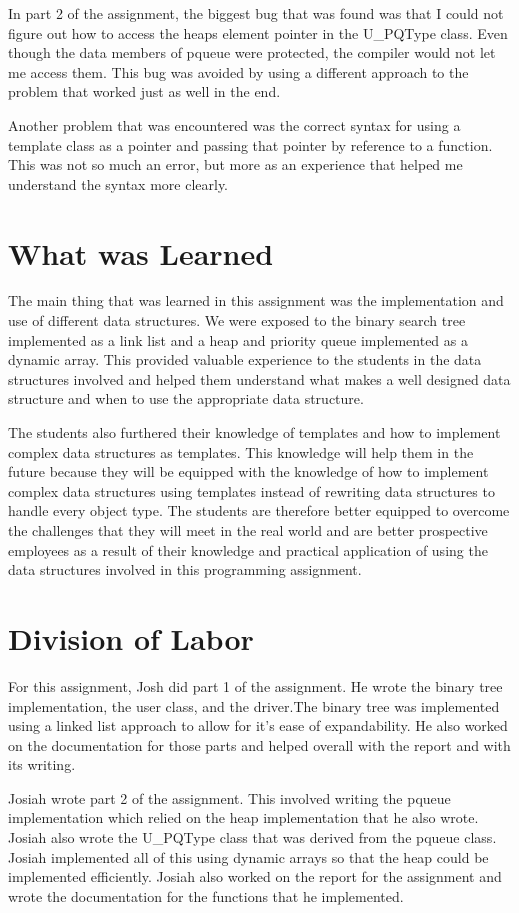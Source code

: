 \documentclass[pdftex, 12pt]{article}
\begin{document}
In part 2 of the assignment, the biggest bug that was found was that I could not figure out how to access the heaps
element pointer in the U\_PQType class. Even though the data members of pqueue were protected, the compiler would not
let me access them. This bug was avoided by using a different approach to the problem that worked just as well in the
end. 

Another problem that was encountered was the correct syntax for using a template class as a pointer and passing that
pointer by reference to a function. This was not so much an error, but more as an experience that helped me understand
the syntax more clearly. 

\section{What was Learned}

The main thing that was learned in this assignment was the implementation and use of different data structures. We were
exposed to the binary search tree implemented as a link list and a heap and priority queue implemented as a dynamic
array. This provided valuable experience to the students in the data structures involved and helped them understand what
makes a well designed data structure and when to use the appropriate data structure. 

The students also furthered their knowledge of templates and how to implement complex data structures as templates. This
knowledge will help them in the future because they will be equipped with the knowledge of how to implement complex data
structures using templates instead of rewriting data structures to handle every object type. The students are therefore
better equipped to overcome the challenges that they will meet in the real world and are better prospective employees as
a result of their knowledge and practical application of using the data structures involved in this programming
assignment.

\section{Division of Labor}

For this assignment, Josh did part 1 of the assignment. He wrote the binary tree implementation, the user class, and the
driver.The binary tree was implemented using a linked list approach to allow for it's ease of expandability.  He also
worked on the documentation for those parts and helped overall with the report and with its writing.

Josiah wrote part 2 of the assignment. This involved writing the pqueue implementation which relied on the heap
implementation that he also wrote. Josiah also wrote the U\_PQType class that was derived from the pqueue class. Josiah
implemented all of this using dynamic arrays so that the heap could be implemented efficiently. Josiah also worked on
the report for the assignment and wrote the documentation for the functions that he implemented. 
\end{document}
